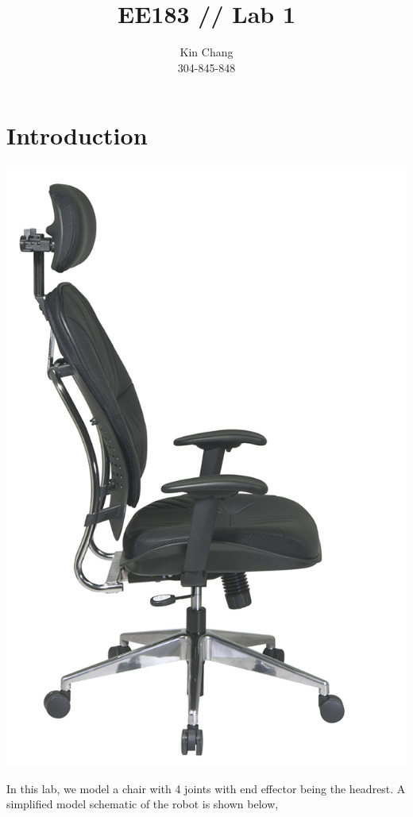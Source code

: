 \documentclass[12pt, letterpaper]{amsart} %
\author{Kin Chang \\ 304-845-848}
\title{EE183 // Lab 1}
\numberwithin{equation}{section}
\begin{document}
\maketitle
\section{Introduction}
\begin{center}
\includegraphics[scale=0.5]{1}  
\end{center}
In this lab, we model a chair with 4 joints with end effector being the headrest. A simplified model schematic of the robot is shown below,
\end{document}
